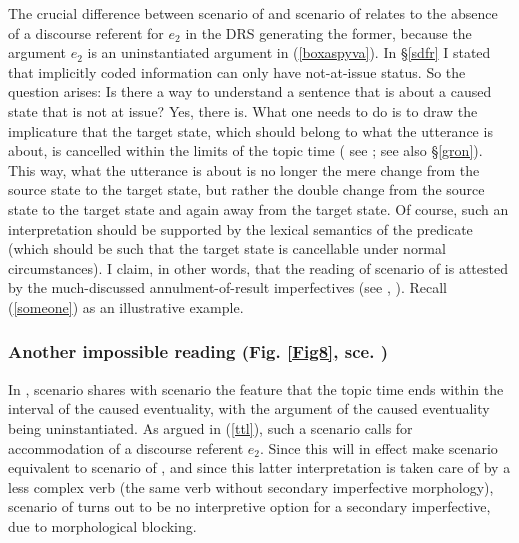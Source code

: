 \documentclass[output=paper,colorlinks,citecolor=brown]{langscibook}
\begin{document}
The crucial difference between scenario  of  and scenario  of  relates to the absence of a discourse referent for $e_2$ in the DRS generating the former, because the argument $e_2$ is an uninstantiated argument in (\ref{boxaspyva}). In \S \ref{sdfr} I stated that implicitly coded information can only have not-at-issue status.
So the question arises: Is there a way to understand a sentence that is about a caused state that is not at issue? Yes, there is. What one needs to do is to draw the implicature that the target state, which should belong to what the utterance is about, is cancelled within the limits of the topic time (%
see \citealt[236]{Gronn2004}; see also \S \ref{gron}). This way, what the utterance is about is no longer the mere change from the source state to the target state, but rather the double change from the source state to the target state and again away from the target state.   
Of course, such an interpretation should be supported by the lexical semantics of the predicate (which should be such that the target state is cancellable under normal circumstances).   
I claim, in other words, that the reading of scenario  of  is attested by the much-discussed annulment-of-result imperfectives (see \citealt{Rassud68}, \citealt{paduceva96}).
Recall (\ref{someone}) as an illustrative example. 

\subsubsection{Another impossible reading (Fig. \ref{Fig8}, sce. )} 
In , scenario  shares with scenario  the feature that the topic time ends within the interval of the caused eventuality, with the argument of the caused eventuality being uninstantiated. As argued in (\ref{ttl}), such a scenario calls for accommodation of a discourse referent $e_2$.
Since this will in effect make scenario  equivalent to scenario  of , and since this latter interpretation is taken care of by a less complex verb (the same verb without secondary imperfective morphology),
scenario  of  turns out to be no interpretive option for a
secondary imperfective, due to morphological blocking.
\end{document}
